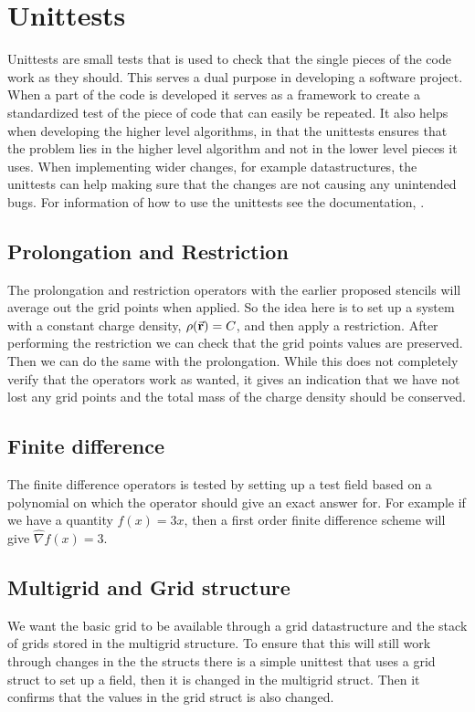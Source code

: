 \section{Unittests}
\label{sec:unittests}
Unittests are small tests that is used to check that the single pieces of the code
work as they should. This serves a dual purpose in developing a software project.
When a part of the code is developed it serves as a framework to create a standardized
test of the piece of code that can easily be repeated.
It also helps when developing the higher level algorithms, in that the unittests ensures
that the problem lies in the higher level algorithm and not in the lower level pieces
it uses. When implementing wider changes, for example datastructures, the unittests
can help making sure that the changes are not causing any unintended bugs. For
information of how to use the unittests see the documentation, \cite{documentation}.

\subsection{Prolongation and Restriction}
	The prolongation and restriction operators with the earlier proposed stencils
  will average out the grid points when applied. So the idea here is to set up a
  system with a constant charge density, \(\rho(\va{r}) = C\), and then apply a
  restriction. After performing the restriction we can check that the grid points
  values are preserved. Then we can do the same with the prolongation. While this
  does not completely verify that the operators work as wanted, it gives an indication
	that we have not lost any grid points and the total mass of the charge density should be conserved.

\subsection{Finite difference}
  The finite difference operators is tested by setting up a test
  field based on a polynomial on which the operator should give an exact answer for.
  For example if we have a quantity \(f(x) = 3x\), then a first order finite difference
  scheme will give \(\hat{\nabla}f(x) = 3\).

\subsection{Multigrid and Grid structure}
  We want the basic grid to be available through a grid datastructure and the stack
  of grids stored in the multigrid structure. To ensure that this will still work
  through changes in the the structs there is a simple unittest that uses a grid struct
  to set up a field, then it is changed in the multigrid struct. Then it confirms
  that the values in the grid struct is also changed.

